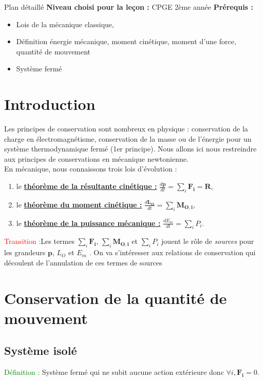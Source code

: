 \begin{reportBlock}{Plan détaillé}
  \textbf{Niveau choisi pour la leçon :} CPGE 2ème année
  \newline
  \textbf{Prérequis : }
  \begin{itemize}
      \item Lois de la mécanique classique,
      \item Définition énergie mécanique, moment cinétique, moment d'une force, quantité de mouvement
      \item Système fermé
  \end{itemize}


\section*{Introduction}
Les principes de conservation sont nombreux en physique : conservation de la charge en électromagnétisme, conservation de la masse ou de l'énergie pour un système thermodynamique fermé (1er principe). Nous allons ici nous restreindre aux principes de conservations en mécanique newtonienne.\\

En mécanique, nous connaissons trois lois d'évolution :
\begin{enumerate}
    \item le \underline{\textbf{théorème de la résultante cinétique :}} $\frac{d\mathbf{p}}{dt}=\sum_{i}\mathbf{F_i}=\mathbf{R}$,
    \item le \underline{\textbf{théorème du moment cinétique :}} $\frac{d\mathbf{L_O}}{dt}=\sum_{i}\mathbf{M_{O,i}}$,
    \item le \underline{\textbf{théorème de la puissance mécanique :}} $\frac{dE_m}{dt}=\sum_{i}P_i$.
\end{enumerate}

\textcolor{red}{Transition :}Les termes $\sum_{i}\mathbf{F_i}$, $\sum_{i}\mathbf{M_{O,i}}$ et $\sum_{i}P_i$ jouent le rôle de \textit{sources} pour les grandeurs $\mathbf{p}$, $L_O$ et $E_m$ . On va s'intéresser aux relations de conservation qui découlent de l'annulation de ces termes de sources 

\section{Conservation de la quantité de mouvement}

\subsection{Système isolé}
\textcolor{green}{Définition :} Système fermé qui ne subit aucune action extérieure donc $\forall i, \mathbf{F_i}=0$. \\


\end{reportBlock}
